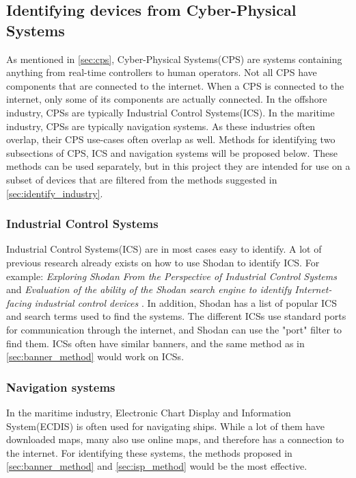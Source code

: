 \subsection{Identifying devices from Cyber-Physical Systems} \label{sec:identify_cps}
As mentioned in \cref{sec:cps}, Cyber-Physical Systems(CPS) are systems containing anything from real-time controllers to human operators. Not all CPS have components that are connected to the internet. When a CPS is connected to the internet, only some of its components are actually connected. In the offshore industry, CPSs are typically Industrial Control Systems(ICS). In the maritime industry, CPSs are typically navigation systems. As these industries often overlap, their CPS use-cases often overlap as well. Methods for identifying two subsections of CPS, ICS and navigation systems will be proposed below.
These methods can be used separately, but in this project they are intended for use on a subset of devices that are filtered from the methods suggested in \cref{sec:identify_industry}.

\subsubsection{Industrial Control Systems}
Industrial Control Systems(ICS) are in most cases easy to identify. A lot of previous research already exists on how to use Shodan to identify ICS. For example: \textit{Exploring Shodan From the Perspective of Industrial Control Systems}\cite{bodenheim_butts_dunlap_mullins_2014} and \textit{Evaluation of the ability of the Shodan search engine to identify Internet-facing industrial control devices} \cite{ICS_shodan_article}.  In addition, Shodan has a list of popular ICS and search terms used to find the systems.\cite{shodan_ics} The different ICSs use standard ports for communication through the internet, and Shodan can use the "port" filter to find them. ICSs often have similar banners, and the same method as in \cref{sec:banner_method} would work on ICSs.

\subsubsection{Navigation systems}
In the maritime industry, Electronic Chart Display and Information System(ECDIS) is often used for navigating ships. While a lot of them have downloaded maps, many also use online maps, and therefore has a connection to the internet. For identifying these systems, the methods proposed in \cref{sec:banner_method} and \cref{sec:isp_method} would be the most effective.

\newpage
